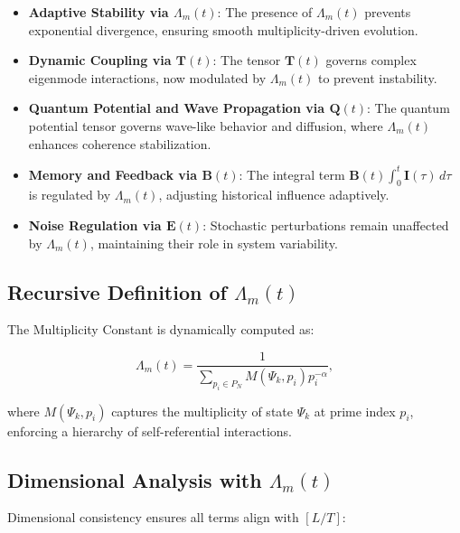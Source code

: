 \documentclass{article}
\theoremstyle{plain}
\begin{document}
\begin{itemize}
    \item \textbf{Adaptive Stability via \( \Lambda_m(t) \)}: The presence of \( \Lambda_m(t) \) prevents exponential divergence, ensuring smooth multiplicity-driven evolution.
    \item \textbf{Dynamic Coupling via \( \bm{T}(t) \)}: The tensor \( \bm{T}(t) \) governs complex eigenmode interactions, now modulated by \( \Lambda_m(t) \) to prevent instability.
    \item \textbf{Quantum Potential and Wave Propagation via \( \bm{Q}(t) \)}: The quantum potential tensor governs wave-like behavior and diffusion, where \( \Lambda_m(t) \) enhances coherence stabilization.
    \item \textbf{Memory and Feedback via \( \bm{B}(t) \)}: The integral term \( \bm{B}(t) \int_0^t \bm{I}(\tau) \, d\tau \) is regulated by \( \Lambda_m(t) \), adjusting historical influence adaptively.
    \item \textbf{Noise Regulation via \( \bm{E}(t) \)}: Stochastic perturbations remain unaffected by \( \Lambda_m(t) \), maintaining their role in system variability.
\end{itemize}

\subsection{Recursive Definition of \( \Lambda_m(t) \)}

The Multiplicity Constant is dynamically computed as:

\begin{equation}
\Lambda_m(t) = \frac{1}{\sum_{p_i \in P_N} M(\Psi_k, p_i) p_i^{-\alpha}},
\end{equation}

where \( M(\Psi_k, p_i) \) captures the multiplicity of state \( \Psi_k \) at prime index \( p_i \), enforcing a hierarchy of self-referential interactions.

\subsection{Dimensional Analysis with \( \Lambda_m(t) \)}

Dimensional consistency ensures all terms align with \( [L/T] \):
\end{document}
